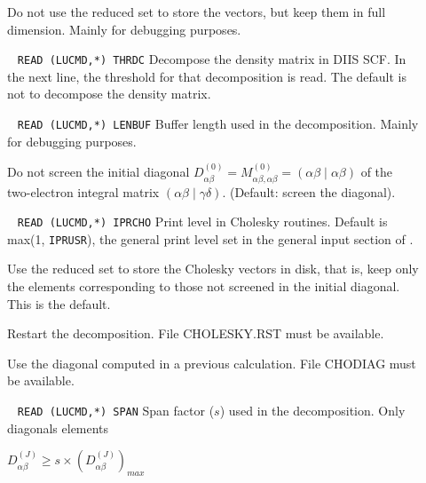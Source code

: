 \begin{description}
%
\item[] 
        Do not use the reduced set to store the vectors, but keep them in
        full dimension. Mainly for debugging purposes.
%
\item[] \verb| |\newline
\verb|READ (LUCMD,*) THRDC|\newline
        Decompose the density matrix in DIIS SCF. In the next line, the
        threshold for that decomposition is read. The default is not to
        decompose the density matrix.
%
\item[] \verb| |\newline
\verb|READ (LUCMD,*) LENBUF|\newline
        Buffer length used in the decomposition. Mainly for debugging purposes.
%
\item[] 
        Do not screen  the initial diagonal 
        $D^{(0)}_{\alpha \beta}=
         M^{(0)}_{\alpha \beta,\alpha \beta}=(\alpha \beta \mid \alpha \beta)$
        of the two-electron integral matrix $(\alpha \beta \mid \gamma \delta)$.
        (Default: screen the diagonal).
%
\item[] \verb| |\newline
\verb|READ (LUCMD,*) IPRCHO|\newline
        Print level in Cholesky routines.
        Default is max(1, \verb|IPRUSR|), the general print level
        set in the general input section of \dalton.
%
\item[] 
        Use the reduced set to store the Cholesky vectors in disk, that is, keep
        only the elements corresponding to those not screened in the initial
        diagonal. This is the default.
%
\item[]
        Restart the decomposition. File CHOLESKY.RST must be available.
%
\item[]
        Use the diagonal computed in a previous calculation. File CHODIAG
        must be available.
%
\item[] \verb| |\newline
\verb|READ (LUCMD,*) SPAN|\newline
        Span factor ($s$) used in the decomposition. Only diagonals elements 
        \newline 
        \begin{center}
        $D^{(J)}_{\alpha \beta} \geq s \times (D^{(J)}_{\alpha \beta})_{max}$

\end{center}
\end{description}
